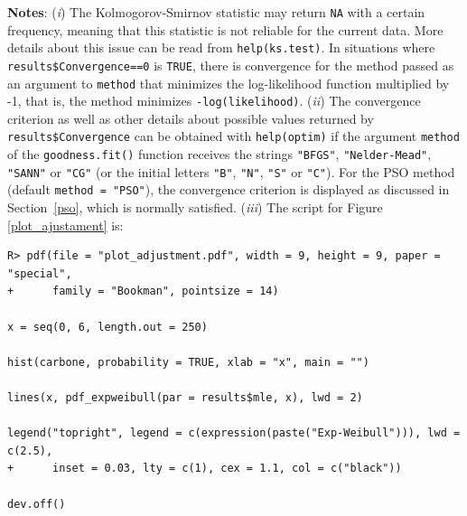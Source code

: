 \documentclass[10pt,letterpaper]{article}
\begin{document}
\textbf{Notes}: ({\it i}) The Kolmogorov-Smirnov statistic may return \texttt{NA} with a certain frequency,
meaning  that this statistic is not reliable for the current data.
More details about this issue can be read from \texttt{help(ks.test)}.
In situations where \texttt{results\$Convergence==0} is \texttt{TRUE}, there is convergence for the method passed as an argument
to \texttt{method} that minimizes the log-likelihood function multiplied by -1, that is, the method minimizes \texttt{-log(likelihood)}.
({\it ii}) The convergence criterion as well as other details about possible values returned by \texttt{results\$Convergence}
can be obtained with \texttt{help(optim)} if the argument \texttt{method} of the \texttt{goodness.fit()} function receives
the strings \texttt{"BFGS"}, \texttt{"Nelder-Mead"}, \texttt{"SANN"} or \texttt{"CG"} (or the initial letters \texttt{"B"}, \texttt{"N"}, \texttt{"S"} or \texttt{"C"}).
For the PSO method  (default \texttt{method = "PSO"}), the convergence criterion is displayed as discussed in Section~\ref{pso}, which is normally  satisfied.
({\it iii}) The script for Figure \ref{plot_ajustament} is:

\begin{verbatim}
R> pdf(file = "plot_adjustment.pdf", width = 9, height = 9, paper = "special",
+      family = "Bookman", pointsize = 14)

x = seq(0, 6, length.out = 250)

hist(carbone, probability = TRUE, xlab = "x", main = "")

lines(x, pdf_expweibull(par = results$mle, x), lwd = 2)

legend("topright", legend = c(expression(paste("Exp-Weibull"))), lwd = c(2.5),
+      inset = 0.03, lty = c(1), cex = 1.1, col = c("black"))

dev.off()
\end{verbatim}
\end{document}
